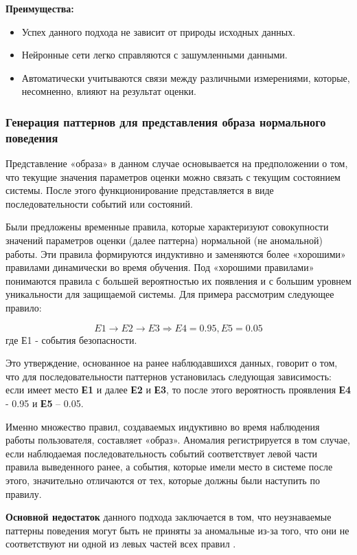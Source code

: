 \textbf{Преимущества:}
\begin{itemize}
    \item Успех данного подхода не зависит от природы исходных данных.
    \item Нейронные сети легко справляются с зашумленными данными.
    \item Автоматически учитываются связи между различными измерениями, которые,
    несомненно, влияют на результат оценки.
\end{itemize}


\subsubsection{Генерация паттернов для представления образа нормального поведения}
Представление «образа» в данном случае основывается на предположении о том, что текущие значения
параметров оценки можно связать с текущим состоянием системы. После этого функционирование
представляется в виде последовательности событий или состояний.

Были предложены временные правила, которые характеризуют совокупности значений параметров оценки
(далее паттерна) нормальной (не аномальной) работы. Эти правила формируются индуктивно и заменяются
более «хорошими» правилами динамически во время обучения. Под «хорошими правилами» понимаются правила
с большей вероятностью их появления и с большим уровнем уникальности для защищаемой системы.
Для примера рассмотрим следующее правило:

\begin{equation}
	E1 \rightarrow E2\rightarrow E3 \Rightarrow E4 = 0.95, E5 = 0.05
\end{equation}
где Е1 - события безопасности.

Это утверждение, основанное на ранее наблюдавшихся данных, говорит о том, что для последовательности
паттернов установилась следующая зависимость: если имеет место \textbf{Е1} и далее \textbf{Е2} и \textbf{Е3},
то после этого вероятность проявления \textbf{Е4} - 0.95 и \textbf{Е5} – 0.05.

Именно множество правил, создаваемых индуктивно во время наблюдения работы пользователя, составляет «образ».
Аномалия регистрируется в том случае, если наблюдаемая последовательность событий соответствует левой
части правила выведенного ранее, а события, которые имели место в системе после этого,
значительно отличаются от тех, которые должны были наступить по правилу.

\textbf{Основной недостаток} данного подхода заключается в том, что неузнаваемые паттерны поведения могут
быть не приняты за аномальные из-за того, что они не соответствуют ни одной из левых частей
всех правил \autocite{IDSystem}.

